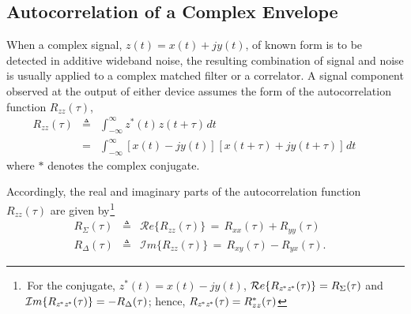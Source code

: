 \documentclass[journal]{IEEEtran}
\begin{document}
\subsection{Autocorrelation of a Complex Envelope} 
When a complex signal, $z(t)= x(t)+jy(t)$, of known form is to be detected in additive wideband noise, the resulting combination of signal and noise is usually applied to a complex matched filter or a correlator. A signal component observed at the output of either device assumes the form of the autocorrelation function $R_{zz}(\tau)$, 
\begin{eqnarray}
	R_{zz}(\tau) &\!\!\triangleq\!\!& \! 
	\int_{-\infty}^{\infty}\!\! {z}^*(t)\mspace{1mu} z(t+\tau) \mspace{2mu} dt \nonumber \\
	&\!\!=\!\!\!& \!
	\int_{-\infty}^{\infty}\!\!
	[x(t) - j y(t)]\mspace{1mu}[x(t+\tau) + j y(t+\tau)] \mspace{2mu} dt  \qquad 
\end{eqnarray}
where $*$ denotes the complex conjugate.

Accordingly, the real and imaginary parts of the autocorrelation function $R_{zz}(\tau)$ are given by$\mspace{1mu}${\footnote {\,For the conjugate, $z^*(t)=x(t)\!-\!jy(t)$, 
$\mathcal{R}e\{R_{z^{\mspace{-2mu}*}z^{\mspace{-2mu}*}}(\tau)\}=R_\Sigma(\tau)$ and 
$\mathcal{I}m\{R_{z^{\mspace{-2mu}*}z^{\mspace{-2mu}*}}(\tau)\}=-R_\Delta(\tau)$; 
hence, $R_{z^{\mspace{-2mu}*}z^{\mspace{-2mu}*}}(\tau)= R^*_{zz}(\tau)$
}} 
\begin{eqnarray}
	R_\Sigma(\tau)\!\! &\!\triangleq\!\!& 
	\mathcal{R}e\{R_{zz}(\tau)\}\,=\,
	R_{xx}(\tau) + R_{yy}(\tau)  \\
	R_\Delta(\tau)\!\! &\!\triangleq\!\!&   
	\mathcal{I}m\{R_{zz}(\tau)\}\,=\,
	R_{xy}(\tau) - R_{yx}(\tau). \quad
\end{eqnarray}
\end{document}
